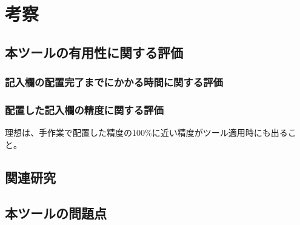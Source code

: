 \chapter{考察}\label{cha:Discussion}



\section{本ツールの有用性に関する評価}\label{sec:evalue_usefulness}

\subsection{記入欄の配置完了までにかかる時間に関する評価}\label{subsec:evalue_required_time}

\subsection{配置した記入欄の精度に関する評価}\label{subsec:evalue_accuracy}
理想は、手作業で配置した精度の100\%に近い精度がツール適用時にも出ること。



\section{関連研究}\label{sec:relation_research}



\section{本ツールの問題点}\label{sec:AWSEL_problems}